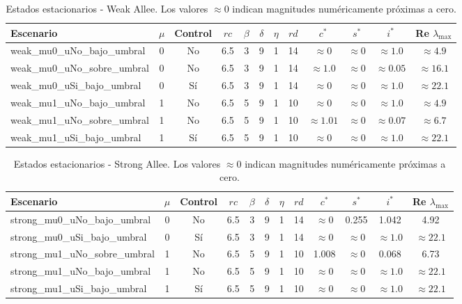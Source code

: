 \begin{table}[H]
\centering
\scriptsize
\begin{tabular}{lccccccccccc}
\toprule
Escenario & $\mu$ & Control & $rc$ & $\beta$ & $\delta$ & $\eta$ & $rd$ & $c^*$ & $s^*$ & $i^*$ & Re $\lambda_{\max}$ \\
\midrule
weak\_mu0\_uNo\_bajo\_umbral & 0 & No & 6.5 & 3 & 9 & 1 & 14 & $\approx 0$ & $\approx 0$ & $\approx 1.0$ & $\approx 4.9$ \\
weak\_mu0\_uNo\_sobre\_umbral & 0 & No & 6.5 & 3 & 9 & 1 & 14 & $\approx 1.0$ & $\approx 0$ & $\approx 0.05$ & $\approx 16.1$ \\
weak\_mu0\_uSi\_bajo\_umbral & 0 & Sí & 6.5 & 3 & 9 & 1 & 14 & $\approx 0$ & $\approx 0$ & $\approx 1.0$ & $\approx 22.1$ \\
weak\_mu1\_uNo\_bajo\_umbral & 1 & No & 6.5 & 5 & 9 & 1 & 10 & $\approx 0$ & $\approx 0$ & $\approx 1.0$ & $\approx 4.9$ \\
weak\_mu1\_uNo\_sobre\_umbral & 1 & No & 6.5 & 5 & 9 & 1 & 10 & $\approx 1.01$ & $\approx 0$ & $\approx 0.07$ & $\approx 6.7$ \\
weak\_mu1\_uSi\_bajo\_umbral & 1 & Sí & 6.5 & 5 & 9 & 1 & 10 & $\approx 0$ & $\approx 0$ & $\approx 1.0$ & $\approx 22.1$ \\
\bottomrule
\end{tabular}
\caption{Estados estacionarios - Weak Allee. Los valores $\approx 0$ indican magnitudes numéricamente próximas a cero.}
\label{tab:steady_weak}
\end{table}

\begin{table}[H]
\centering
\scriptsize
\begin{tabular}{lccccccccccc}
\toprule
Escenario & $\mu$ & Control & $rc$ & $\beta$ & $\delta$ & $\eta$ & $rd$ & $c^*$ & $s^*$ & $i^*$ & Re $\lambda_{\max}$ \\
\midrule
strong\_mu0\_uNo\_bajo\_umbral & 0 & No & 6.5 & 3 & 9 & 1 & 14 & $\approx 0$ & 0.255 & 1.042 & 4.92 \\
strong\_mu0\_uSi\_bajo\_umbral & 0 & Sí & 6.5 & 3 & 9 & 1 & 14 & $\approx 0$ & $\approx 0$ & $\approx 1.0$ & $\approx 22.1$ \\
strong\_mu1\_uNo\_sobre\_umbral & 1 & No & 6.5 & 5 & 9 & 1 & 10 & 1.008 & $\approx 0$ & 0.068 & 6.73 \\
strong\_mu1\_uNo\_bajo\_umbral & 1 & No & 6.5 & 5 & 9 & 1 & 10 & $\approx 0$ & $\approx 0$ & $\approx 1.0$ & $\approx 22.1$ \\
strong\_mu1\_uSi\_bajo\_umbral & 1 & Sí & 6.5 & 5 & 9 & 1 & 10 & $\approx 0$ & $\approx 0$ & $\approx 1.0$ & $\approx 22.1$ \\
\bottomrule
\end{tabular}
\caption{Estados estacionarios - Strong Allee. Los valores $\approx 0$ indican magnitudes numéricamente próximas a cero.}
\label{tab:steady_strong}
\end{table}

